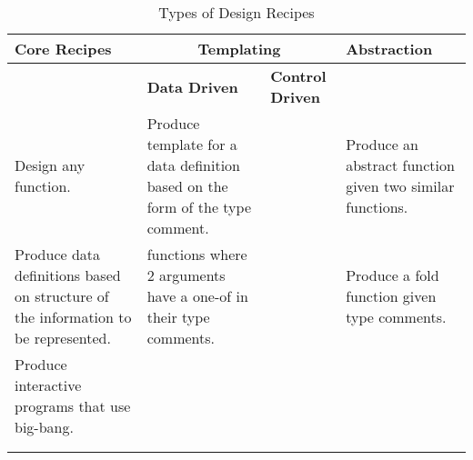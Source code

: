 \documentclass[11pt,a4paper]{report}
\begin{document}
	\begin{table}[!h]
		\renewcommand{\arraystretch}{1.5}
		\renewcommand{\tabcolsep}{0.2cm}
		\begin{tabularx}{\textwidth}{| X | X | X | X |}
			\hline
			\textbf{Core Recipes}                                                                                              &                                                 \multicolumn{2}{c|}{\textbf{Templating}}                                                 & \textbf{Abstraction}                                                           \\
			\hline
			                                                                                                                   & \textbf{Data Driven}                                                                                       & \textbf{Control Driven}     &                                                                                \\
			\hline
			\emph{\nameref{ch:htdf}} Design any function.                                                         & \emph{\nameref{ch:data_driv_temp}} Produce template for a data definition based on the form of the type comment. & \emph{\nameref{sec:fun_comp}} & \emph{\nameref{sec:abs_from_eg}} Produce an abstract function given two similar functions. \\
			\hline
			\emph{\nameref{ch:htdd}} Produce data definitions based on structure of the information to be represented. & \emph{\nameref{ch:fun_2_1_of_data}} functions where 2 arguments have a one-of in their type comments.                     & \emph{\nameref{sec:back_srch}}  & \emph{\nameref{sec:abs_from_type_comm}} Produce a fold function given type comments.         \\
			\hline
			\emph{\nameref{ch:htdw}} Produce interactive programs that use big-bang.                                 &                                                                                                            & \emph{\nameref{sec:gen_recur}} &                                                                                \\
			\hline
			                                                                                                                   &                                                                                                            & \emph{\nameref{ch:accumulators}}         & \emph{\nameref{sec:using_abs_func}}                                                \\
			\hline
			                                                                                                                   &                                              \multicolumn{2}{c|}{\emph{\nameref{ch:temp_blend}}}                                               &                                                                                \\
			\hline
		\end{tabularx}
		\caption{Types of Design Recipes}
	\end{table}
\end{document}

